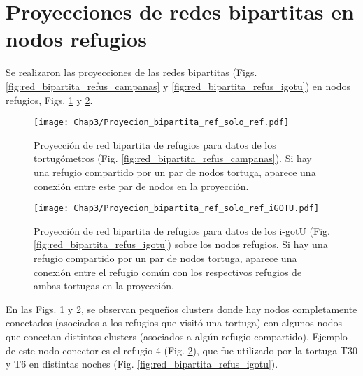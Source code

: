 \section{Proyecciones de redes bipartitas en nodos refugios}
Se realizaron las proyecciones de las redes bipartitas (Figs. \ref{fig:red_bipartita_refus_campanas} y \ref{fig:red_bipartita_refus_igotu}) en nodos refugios, Figs. \ref{fig:proyeccion_red_campanas_refus} y \ref{fig:proyeccion_red_igotu_refus}.
 
 
\begin{figure}[ht]
    \begin{center}
        \texttt{[image: Chap3/Proyecion\_bipartita\_ref\_solo\_ref.pdf]}
        \caption[Proyección  de red bipartita de refugios para datos de los tortugómetros en nodos refugios.]{Proyección  de red bipartita de refugios para datos de los tortugómetros (Fig. \ref{fig:red_bipartita_refus_campanas}). Si hay una refugio compartido por un par de nodos tortuga, aparece una conexión entre este par de nodos en la proyección. }
        \label{fig:proyeccion_red_campanas_refus}
       
        \end{center}
\end{figure}
 
\begin{figure}[ht]
    \begin{center}
        \texttt{[image: Chap3/Proyecion\_bipartita\_ref\_solo\_ref\_iGOTU.pdf]}
        \caption[Proyección  de red bipartita de refugios para datos de los i-gotU en nodos refugios.]{Proyección  de red bipartita de refugios para datos de los i-gotU (Fig. \ref{fig:red_bipartita_refus_igotu}) sobre los nodos refugios. Si hay una refugio compartido por un par de nodos tortuga, aparece una conexión entre el refugio común con los respectivos refugios de ambas tortugas en la proyección. }
        \label{fig:proyeccion_red_igotu_refus}
       
        \end{center}
\end{figure}
En las Figs. \ref{fig:proyeccion_red_campanas_refus} y \ref{fig:proyeccion_red_igotu_refus}, se observan pequeños clusters donde hay nodos completamente conectados (asociados a los refugios que visitó una tortuga) con algunos nodos que conectan distintos clusters (asociados a algún refugio compartido). Ejemplo de este nodo conector es el refugio 4 (Fig. \ref{fig:proyeccion_red_igotu_refus}), que fue utilizado por la tortuga T30 y T6 en distintas noches (Fig. \ref{fig:red_bipartita_refus_igotu}).
 
